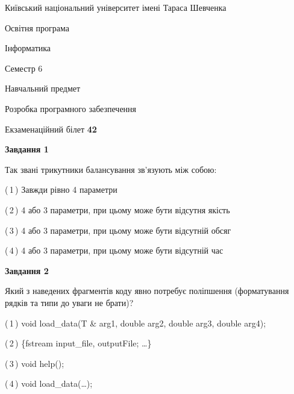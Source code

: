 \documentclass[10pt, ukrainian]{article}
\begin{document}
{{\begin {small}\par
{ \center  Київський національний університет імені Тараса Шевченка \par}
{\parbox {5 cm}{Освітня програма \hfill}{\parbox {7 cm}{Інформатика \hfill}}\parbox {6 cm}{\hfill Семестр 6}}\par
{\parbox {5 cm} {Навчальний предмет \hfill}\parbox {7 cm}{Розробка програмного забезпечення \hfill}\parbox {6cm}{\hfill}\par}\vspace{-7pt} \end{small}}{\center Екзаменаційний білет \No \textbf
{ 42 }\par}}
{
\begin {large}
{\begin {center}\textbf{Завдання 1}\end {center}}\par
Так звані трикутники балансування зв'язують між собою:\par
\vspace{2mm}



(\,1\,) Завжди рівно 4 параметри%



(\,2\,) 4 або 3 параметри, при цьому може бути відсутня якість%



(\,3\,) 4 або 3 параметри, при цьому може бути відсутній обсяг %



(\,4\,) 4 або 3 параметри, при цьому може бути відсутній час%


{\begin {center}\textbf{Завдання 2}\end {center}}\par
Який з наведених фрагментів коду явно потребує поліпшення (форматування рядків та типи до уваги не брати)?\par
\vspace{2mm}



(\,1\,) void load\_data(T \& arg1, double arg2, double arg3, double arg4); %



(\,2\,) \{fstream input\_file, outputFile; …\}%



(\,3\,) void help();%



(\,4\,) void load\_data(…);%



\end{large}}
\end{document}
